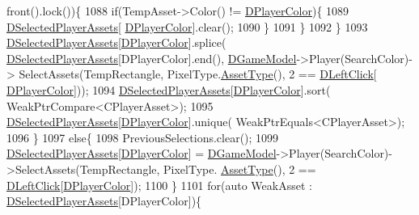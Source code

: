 \begin{DoxyCode}
      front().lock())\{
1088                                 \textcolor{keywordflow}{if}(TempAsset->Color() != \hyperlink{classCApplicationData_a53550939b20cba70570f113e4d1c5d02}{DPlayerColor})\{
1089                                     \hyperlink{classCApplicationData_a05c1087d5a5c4ddc14fcb37444f1642b}{DSelectedPlayerAssets}[
      \hyperlink{classCApplicationData_a53550939b20cba70570f113e4d1c5d02}{DPlayerColor}].clear();
1090                                 \}
1091                             \}
1092                         \}
1093                         \hyperlink{classCApplicationData_a05c1087d5a5c4ddc14fcb37444f1642b}{DSelectedPlayerAssets}[\hyperlink{classCApplicationData_a53550939b20cba70570f113e4d1c5d02}{DPlayerColor}].splice(
      \hyperlink{classCApplicationData_a05c1087d5a5c4ddc14fcb37444f1642b}{DSelectedPlayerAssets}[DPlayerColor].end(), \hyperlink{classCApplicationData_a32b50c7c1cbac3cfd67c7f775b1d6fee}{DGameModel}->Player(SearchColor)->
      SelectAssets(TempRectangle, PixelType.\hyperlink{classCPixelType_addcf6c6d11e8ebafe4455beaa995b675}{AssetType}(), 2 == \hyperlink{classCApplicationData_a8a86bb4c7cba7b119121401dda4ca68b}{DLeftClick}[
      \hyperlink{classCApplicationData_a53550939b20cba70570f113e4d1c5d02}{DPlayerColor}]));
1094                         \hyperlink{classCApplicationData_a05c1087d5a5c4ddc14fcb37444f1642b}{DSelectedPlayerAssets}[\hyperlink{classCApplicationData_a53550939b20cba70570f113e4d1c5d02}{DPlayerColor}].sort(
      WeakPtrCompare<CPlayerAsset>);
1095                         \hyperlink{classCApplicationData_a05c1087d5a5c4ddc14fcb37444f1642b}{DSelectedPlayerAssets}[\hyperlink{classCApplicationData_a53550939b20cba70570f113e4d1c5d02}{DPlayerColor}].unique(
      WeakPtrEquals<CPlayerAsset>);
1096                     \}
1097                     \textcolor{keywordflow}{else}\{
1098                         PreviousSelections.clear();
1099                         \hyperlink{classCApplicationData_a05c1087d5a5c4ddc14fcb37444f1642b}{DSelectedPlayerAssets}[\hyperlink{classCApplicationData_a53550939b20cba70570f113e4d1c5d02}{DPlayerColor}] = 
      \hyperlink{classCApplicationData_a32b50c7c1cbac3cfd67c7f775b1d6fee}{DGameModel}->Player(SearchColor)->SelectAssets(TempRectangle, PixelType.
      \hyperlink{classCPixelType_addcf6c6d11e8ebafe4455beaa995b675}{AssetType}(), 2 == \hyperlink{classCApplicationData_a8a86bb4c7cba7b119121401dda4ca68b}{DLeftClick}[\hyperlink{classCApplicationData_a53550939b20cba70570f113e4d1c5d02}{DPlayerColor}]);
1100                     \}
1101                     \textcolor{keywordflow}{for}(\textcolor{keyword}{auto} WeakAsset : \hyperlink{classCApplicationData_a05c1087d5a5c4ddc14fcb37444f1642b}{DSelectedPlayerAssets}[DPlayerColor])\{

\end{DoxyCode}
